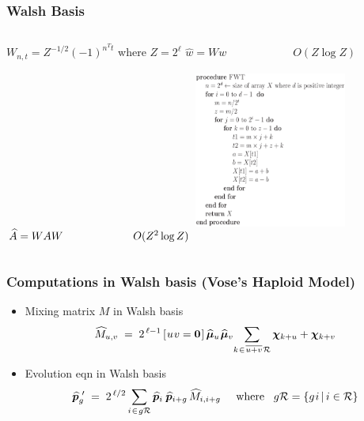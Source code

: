 \documentclass[aspectratio=169]{beamer}
\newcommand{\nudge}{\hspace{0.01in}}
\begin{document}
  \begin{frame}
    \frametitle{Walsh Basis}  
    { 
    \begin{columns}
	 $W_{n,t} = Z^{-1/2} (-1)^{n^T t}$ where $Z = 2^\ell$	 
	 \newline
	$\widehat{w} = Ww \hspace{1in} O(Z \log Z)$       	
	 \newline
	$\widehat{A} = WAW \hspace{0.9in} O(Z^2 \log Z)$	
	  \includegraphics[height=6cm, width=5cm]{figures/eps/fwt.eps} 	  
    \end{columns}    
    }
  \end{frame}
    
  \begin{frame}
    \frametitle{Computations in Walsh basis (Vose's Haploid Model)}
    \begin{itemize}
	\item{Mixing matrix $M$ in Walsh basis 
	\[
	  \widehat{M}_{u,v} \; = \; 2^{\,\ell-1} \,[\nudge u \nudge v = {\bf
	  0}\nudge]\, \widehat{\bm{\mu}}_u \nudge \widehat{\bm{\mu}}_v \!  \sum_{k
	\nudge \in \nudge \overline{u+v} \nudge \mathcal{R}} \bm{\chi}_{k + u} +
	\bm{\chi}_{k + v}
	\]
	}
	\item{Evolution eqn in Walsh basis 
	\[
	  \widehat{\bm{p}}_g^{\,\,\prime} \; = \; 2^{\,\ell/2} \sum_{i \nudge \in \nudge g \mathcal{R}}
	  \widehat{\bm{p}}_i \, \nudge \widehat{\bm{p}}_{i+g} \,\widehat{M}_{i,i+g} 
	  \;\;\;\;\; \mbox{where} \;\;\; g \mathcal{R} = \{g \nudge i \, | \, i \in \mathcal{R} \}
	 \]	 
	}
    \end{itemize}
    
  \end{frame}
  
\end{document}

